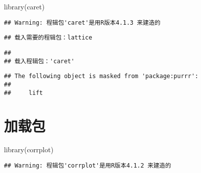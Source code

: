 \documentclass[]{ctexbook}
\newenvironment{Shaded}{\begin{snugshade}}{\end{snugshade}}
\newcommand{\AttributeTok}[1]{\textcolor[rgb]{0.77,0.63,0.00}{#1}}
\newcommand{\ConstantTok}[1]{\textcolor[rgb]{0.00,0.00,0.00}{#1}}
\newcommand{\DecValTok}[1]{\textcolor[rgb]{0.00,0.00,0.81}{#1}}
\newcommand{\FloatTok}[1]{\textcolor[rgb]{0.00,0.00,0.81}{#1}}
\newcommand{\FunctionTok}[1]{\textcolor[rgb]{0.00,0.00,0.00}{#1}}
\newcommand{\NormalTok}[1]{#1}
\newcommand{\OtherTok}[1]{\textcolor[rgb]{0.56,0.35,0.01}{#1}}
\newcommand{\SpecialCharTok}[1]{\textcolor[rgb]{0.00,0.00,0.00}{#1}}
\begin{document}
\begin{Shaded}
\begin{Highlighting}[]
\FunctionTok{library}\NormalTok{(caret)}
\end{Highlighting}
\end{Shaded}

\begin{verbatim}
## Warning: 程辑包'caret'是用R版本4.1.3 来建造的
\end{verbatim}

\begin{verbatim}
## 载入需要的程辑包：lattice
\end{verbatim}

\begin{verbatim}
## 
## 载入程辑包：'caret'
\end{verbatim}

\begin{verbatim}
## The following object is masked from 'package:purrr':
## 
##     lift
\end{verbatim}

\begin{Shaded}
\end{Shaded}

\hypertarget{ux52a0ux8f7dux5305}{%
\section{加载包}\label{ux52a0ux8f7dux5305}}

\begin{Shaded}
\begin{Highlighting}[]
\FunctionTok{library}\NormalTok{(corrplot)}
\end{Highlighting}
\end{Shaded}

\begin{verbatim}
## Warning: 程辑包'corrplot'是用R版本4.1.2 来建造的
\end{verbatim}
\end{document}
